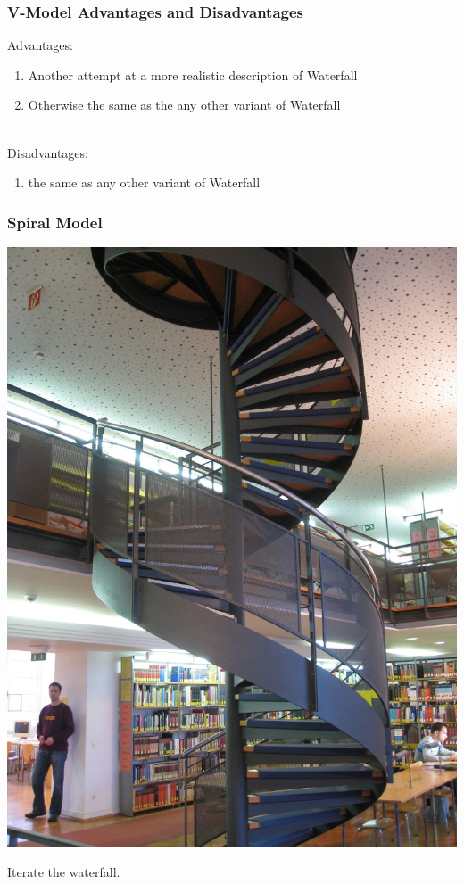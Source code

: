 \begin{frame}
\frametitle{V-Model Advantages and Disadvantages}
\begin{changemargin}{1cm}
Advantages: 
\begin{enumerate}
\item Another attempt at a more realistic description of Waterfall
\item Otherwise the same as the any other variant of Waterfall
\end{enumerate}
~\\[1em]
Disadvantages: 
\begin{enumerate}
\item the same as any other variant of Waterfall
\end{enumerate}

\end{changemargin}
\end{frame}

\begin{frame}
\frametitle{Spiral Model}

\begin{center}
\includegraphics[height=.6\textheight]{images/3821_spiral_staircase_in_library}
\end{center}

\begin{changemargin}{1cm}
Iterate the waterfall.
\end{changemargin}

\end{frame}

